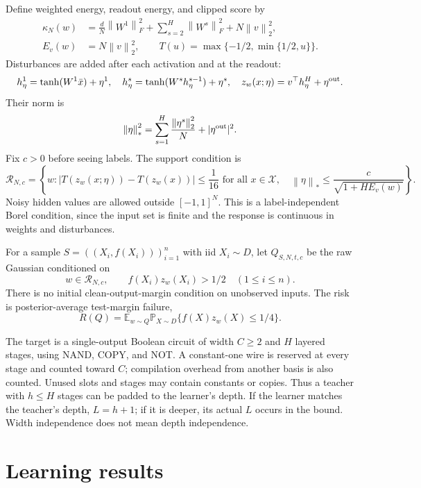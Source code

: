 \documentclass[11pt]{article}
\newcommand{\E}{\mathbb E}
\newcommand{\Prb}{\mathbb P}
\newcommand{\norm}[1]{\left\|#1\right\|}
\begin{document}
Define weighted energy, readout energy, and clipped score by
\begin{align*}
 \kappa_N(w)&=\frac dN\norm{W^1}_F^2+
   \sum_{s=2}^H\norm{W^s}_F^2+N\norm v_2^2,\\
 E_v(w)&=N\norm v_2^2,\qquad
 T(u)=\max\{-1/2,\min\{1/2,u\}\}.
\end{align*}
Disturbances are added after each activation and at the readout:
\[
 h^1_\eta=\tanh(W^1\bar x)+\eta^1,\quad
 h^s_\eta=\tanh(W^sh^{s-1}_\eta)+\eta^s,\quad
 z_w(x;\eta)=v^\top h^H_\eta+\eta^{\rm out}.
\]
Their norm is
\[
 \norm\eta_*^2=\sum_{s=1}^H\frac{\norm{\eta^s}_2^2}{N}
                  +|\eta^{\rm out}|^2.
\]
Fix $c>0$ before seeing labels. The support condition is
\begin{equation}\label{eq:support}
 \mathcal R_{N,c}=\left\{w:
 |T(z_w(x;\eta))-T(z_w(x))|\le\frac1{16}
 \text{ for all }x\in\mathcal X,\quad
 \norm\eta_*\le\frac c{\sqrt{1+HE_v(w)}}\right\}.
\end{equation}
Noisy hidden values are allowed outside $[-1,1]^N$.
This is a label-independent Borel condition, since the input set is finite
and the response is continuous in weights and disturbances.

For a sample $S=((X_i,f(X_i)))_{i=1}^n$ with iid $X_i\sim D$, let
$Q_{S,N,t,c}$ be the raw Gaussian conditioned on
\begin{equation}\label{eq:conditioning}
 w\in\mathcal R_{N,c},\qquad
 f(X_i)z_w(X_i)>1/2\quad(1\le i\le n).
\end{equation}
There is no initial clean-output-margin condition on unobserved inputs.
The risk is posterior-average test-margin failure,
\[
 R(Q)=\E_{w\sim Q}\Prb_{X\sim D}\{f(X)z_w(X)\le1/4\}.
\]

The target is a single-output Boolean circuit of width $C\ge2$ and $H$
layered stages, using NAND, COPY, and NOT. A constant-one wire is reserved
at every stage and counted toward $C$; compilation overhead from another
basis is also counted. Unused slots and stages may contain constants or
copies. Thus a teacher with $h\le H$ stages can be padded to the learner's
depth. If the learner matches the teacher's depth, $L=h+1$; if it is deeper,
its actual $L$ occurs in the bound. Width independence does not mean depth
independence.

\section{Learning results}
\end{document}

